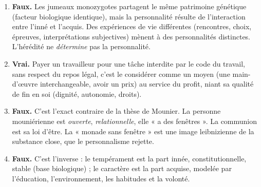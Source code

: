 \documentclass[11pt]{article}
\newcommand{\cle}[1]{{\popxbold\color{popdark}#1}}
\begin{document}
\begin{corrige}
\begin{enumerate}
    \item \textbf{Faux.} Les jumeaux monozygotes partagent le même patrimoine génétique (facteur biologique identique), mais la personnalité résulte de l'interaction entre l'inné et l'acquis. Des expériences de vie différentes (rencontres, choix, épreuves, interprétations subjectives) mènent à des personnalités distinctes. L'hérédité ne \emph{détermine} pas la personnalité.
    \item \textbf{Vrai.} Payer un travailleur pour une tâche interdite par le code du travail, sans respect du repos légal, c'est le considérer comme un \cle{moyen} (une main-d'œuvre interchangeable, avoir un \cle{prix}) au service du profit, niant sa qualité de \cle{fin en soi} (dignité, autonomie, droits).
    \item \textbf{Faux.} C'est l'exact contraire de la thèse de Mounier. La personne mouniérienne est \emph{ouverte}, \emph{relationnelle}, elle « a des fenêtres ». La \cle{communion} est sa loi d'être. La « monade sans fenêtre » est une image leibnizienne de la substance close, que le personnalisme rejette.
    \item \textbf{Faux.} C'est l'inverse : le \cle{tempérament} est la part \cle{innée}, constitutionnelle, stable (base biologique) ; le \cle{caractère} est la part \cle{acquise}, modelée par l'éducation, l'environnement, les habitudes et la volonté.
\end{enumerate}
\end{corrige}
\end{document}
